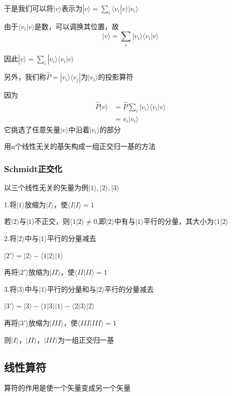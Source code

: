 \documentclass[lang=cn,15pt]{elegantbook}
\begin{document}
于是我们可以将$|v\rangle$表示为$|v\rangle=\sum_{i}	\langle v_i|v\rangle|v_i\rangle$

由于$\langle v_i|v\rangle$是数，可以调换其位置，故
\begin{equation*}
	|v\rangle =\sum_i{|v_i\rangle \langle v_i|v\rangle}
\end{equation*}

因此$ |v\rangle =\sum_i|v_i\rangle \langle v_i|v\rangle$
	
另外，我们称$\hat{P}=|v_i\rangle \langle v_j|\text{为}|v_i\rangle \text{的投影算符}$

因为
\begin{equation*}
	\begin{split}
		\hat{P}|v\rangle &=\hat{P}\sum_i|v_i\rangle \langle v_i|v\rangle\\&=v_i|v_i\rangle
	\end{split}
\end{equation*}
它挑选了任意矢量$|v\rangle$中沿着$|v_i\rangle$的部分

用n个线性无关的基矢构成一组正交归一基的方法

\subsubsection{Schmidt正交化}
以三个线性无关的矢量为例$|1\rangle,|2\rangle,|3\rangle$

1.将$|1\rangle$放缩为$|I\rangle$，使$\langle I|I\rangle=1$

若$|2\rangle$与$|1\rangle$不正交，则$\langle 1|2\rangle\ne0$,即$|2\rangle$中有与$|1\rangle$平行的分量，其大小为$\langle 1|2\rangle$

2.将$|2\rangle$中与$|1\rangle$平行的分量减去

$|2'\rangle=|2\rangle-\langle 1|2\rangle|1\rangle$

再将$|2'\rangle$放缩为$|II\rangle$，使$\langle II|II\rangle=1$

3.将$|3\rangle$中与$|1\rangle$平行的分量和与$|2\rangle$平行的分量减去

$|3'\rangle=|3\rangle-\langle 1|3\rangle|1\rangle-\langle 2|3\rangle|2\rangle$

再将$|3'\rangle$放缩为$|III\rangle$，使$\langle III|III\rangle=1$

则$|I\rangle$，$|II\rangle$，$|III\rangle$为一组正交归一基
\subsection{线性算符}
算符的作用是使一个矢量变成另一个矢量
\end{document}
